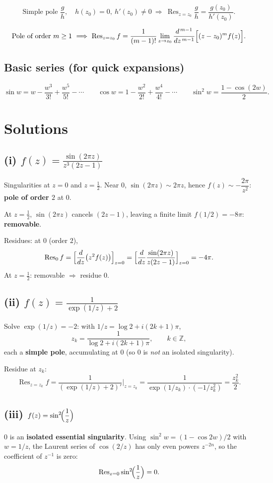 \documentclass[12pt,a4paper]{article}
\begin{document}
\[
\text{Simple pole } \frac{g}{h},\quad h(z_0)=0,\ h'(z_0)\neq0
\ \Longrightarrow\
\operatorname{Res}_{z=z_0}\!\frac{g}{h}=\frac{g(z_0)}{h'(z_0)}.
\]

\[
\text{Pole of order } m\ge1
\ \Longrightarrow\
\operatorname{Res}_{z=z_0} f
=\frac{1}{(m-1)!}\lim_{z\to z_0}
\frac{d^{\,m-1}}{dz^{\,m-1}}\Bigl[(z-z_0)^{m} f(z)\Bigr].
\]

\subsection*{Basic series (for quick expansions)}
\[
\sin w = w - \frac{w^{3}}{3!} + \frac{w^{5}}{5!} - \cdots
\qquad
\cos w = 1 - \frac{w^{2}}{2!} + \frac{w^{4}}{4!} - \cdots
\qquad
\sin^{2} w = \frac{1-\cos(2w)}{2}.
\]

\section*{Solutions}

\subsection*{(i) $\displaystyle f(z)=\frac{\sin(2\pi z)}{z^{3}(2z-1)}$}
Singularities at $z=0$ and $z=\tfrac12$.
Near $0$, $\sin(2\pi z)\sim 2\pi z$, hence
$f(z)\sim -\dfrac{2\pi}{z^2}$:
\textbf{pole of order $2$} at $0$.

At $z=\tfrac12$, $\sin(2\pi z)$ cancels $(2z-1)$, leaving a finite limit
$f(1/2)=-8\pi$: \textbf{removable}.

Residues: at $0$ (order $2$),
\[
\operatorname{Res}_{0}f
=\Bigl[\frac{d}{dz}\bigl(z^2 f(z)\bigr)\Bigr]_{z=0}
=\Bigl[\frac{d}{dz}\frac{\sin(2\pi z)}{z(2z-1)}\Bigr]_{z=0}
=-4\pi.
\]
At $z=\tfrac12$: removable $\Rightarrow$ residue $0$.

\subsection*{(ii) $\displaystyle f(z)=\frac{1}{\exp(1/z)+2}$}
Solve $\exp(1/z)=-2$: with $1/z=\log 2+i(2k+1)\pi$,
\[
z_k=\frac{1}{\log 2+i(2k+1)\pi},\qquad k\in\mathbb Z,
\]
each a \textbf{simple pole}, accumulating at $0$
(so $0$ is \emph{not} an isolated singularity).

Residue at $z_k$:
\[
\operatorname{Res}_{z=z_k} f
=\frac{1}{(\exp(1/z)+2)'}\Big|_{z=z_k}
=\frac{1}{\exp(1/z_k)\cdot(-1/z_k^2)}
=\frac{z_k^2}{2}.
\]

\subsection*{(iii) $\displaystyle f(z)=\sin^{2}\!\Bigl(\frac{1}{z}\Bigr)$}
$0$ is an \textbf{isolated essential singularity}.
Using $\sin^2 w=(1-\cos 2w)/2$ with $w=1/z$,
the Laurent series of $\cos(2/z)$ has only even powers $z^{-2n}$,
so the coefficient of $z^{-1}$ is zero:
\[
\operatorname{Res}_{z=0}\sin^{2}\!\Bigl(\frac{1}{z}\Bigr)=0.
\]
\end{document}
